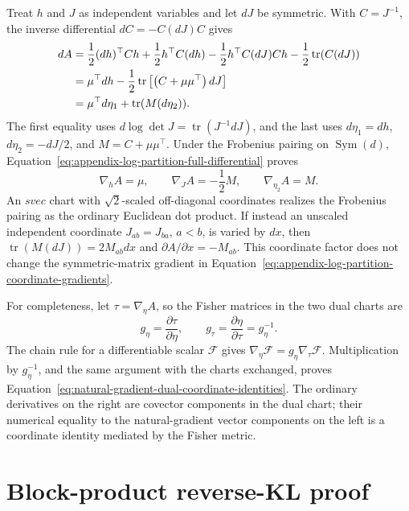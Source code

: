 Treat \(h\) and \(J\) as independent variables and let \(dJ\) be symmetric. With \(C=J^{-1}\), the inverse differential \(dC=-C(dJ)C\) gives
\begin{align}
dA
&=\frac12(dh)^\top Ch+\frac12h^\top C(dh)
-\frac12h^\top C(dJ)Ch
-\frac12\operatorname{tr}(C(dJ))\notag\\
&=\mu^\top dh-\frac12\operatorname{tr}
\left[\left(C+\mu\mu^\top\right)dJ\right]\notag\\
&=\mu^\top d\eta_1+\operatorname{tr}(M(d\eta_2))\text{.}
\label{eq:appendix-log-partition-full-differential}
\end{align}
The first equality uses \(d\log\det J=\operatorname{tr}(J^{-1}dJ)\), and the last uses \(d\eta_1=dh\), \(d\eta_2=-dJ/2\), and \(M=C+\mu\mu^\top\). Under the Frobenius pairing on \(\operatorname{Sym}(d)\), Equation~\eqref{eq:appendix-log-partition-full-differential} proves
\begin{equation}
\nabla_hA=\mu,
\qquad
\nabla_JA=-\frac12M,
\qquad
\nabla_{\eta_2}A=M.
\label{eq:appendix-log-partition-coordinate-gradients}
\end{equation}
An \(svec\) chart with \(\sqrt2\)-scaled off-diagonal coordinates realizes the Frobenius pairing as the ordinary Euclidean dot product. If instead an unscaled independent coordinate \(J_{ab}=J_{ba}\), \(a<b\), is varied by \(dx\), then \(\operatorname{tr}(M(dJ))=2M_{ab}dx\) and \(\partial A/\partial x=-M_{ab}\). This coordinate factor does not change the symmetric-matrix gradient in Equation~\eqref{eq:appendix-log-partition-coordinate-gradients}.

For completeness, let \(\tau=\nabla_\eta A\), so the Fisher matrices in the two dual charts are
\begin{equation}
g_\eta=\frac{\partial\tau}{\partial\eta},
\qquad
g_\tau=\frac{\partial\eta}{\partial\tau}=g_\eta^{-1}.
\label{eq:appendix-dual-fisher-jacobians}
\end{equation}
The chain rule for a differentiable scalar \(\mathcal F\) gives \(\nabla_\eta\mathcal F=g_\eta\nabla_\tau\mathcal F\). Multiplication by \(g_\eta^{-1}\), and the same argument with the charts exchanged, proves Equation~\eqref{eq:natural-gradient-dual-coordinate-identities}. The ordinary derivatives on the right are covector components in the dual chart; their numerical equality to the natural-gradient vector components on the left is a coordinate identity mediated by the Fisher metric.

\section{Block-product reverse-KL proof}
\label{sec:gaussian-block-reverse-kl-proof}


